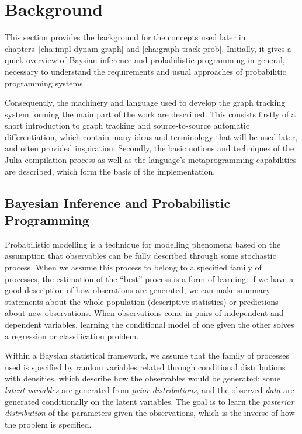 \chapter{Background}
\label{cha:background}

This section provides the background for the concepts used later in
chapters~\ref{cha:impl-dynam-graph} and \ref{cha:graph-track-prob}.  Initially, it gives a quick
overview of Baysian inference and probabilistic programming in general, necessary to understand the
requirements and usual approaches of probabilitic programming systems.

Consequently, the machinery and language used to develop the graph tracking system forming the main
part of the work are described.  This consists firstly of a short introduction to graph tracking and
source-to-source automatic differentiation, which contain many ideas and terminology that will be
used later, and often provided inspiration.  Secondly, the basic notions and techniques of the Julia
compilation process as well as the language's metaprogramming capabilities are described, which form
the basis of the implementation.


\section{Bayesian Inference and Probabilistic Programming}
\label{sec:bayes-infer-prob}

Probabilistic modelling is a technique for modelling phenomena based on the assumption that
observables can be fully described through some stochastic process.  When we assume this process to
belong to a specified family of processes, the estimation of the \enquote{best} process is a form of
learning: if we have a good description of how obserations are generated, we can make summary
statements about the whole population (descriptive statistics) or predictions about new
observations.  When observations come in pairs of independent and dependent variables, learning the
conditional model of one given the other solves a regression or classification problem.

Within a Baysian statistical framework, we assume that the family of processes used is specified by
random variables related through conditional distributions with densities, which describe how the
observables would be generated: some \emph{latent variables} are generated from \emph{prior
  distributions}, and the observed \emph{data} are generated conditionally on the latent variables.
The goal is to learn the \emph{posterior distribution} of the parameters given the observations,
which is the inverse of how the problem is specified.


